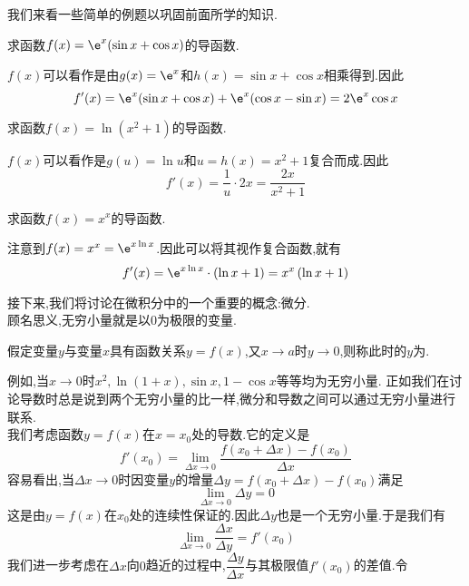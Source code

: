 \documentclass{ctexart}
\begin{document}
我们来看一些简单的例题以巩固前面所学的知识.
\begin{exercise}[E.0A.1]
    求函数$f(x)=\e^x(\sin x+\cos x)$的导函数.
\end{exercise}
\begin{solution}
    $f(x)$可以看作是由$g(x)=\e^x$和$h(x)=\sin x+\cos x$相乘得到.因此
    \[f'(x)=\e^x(\sin x+\cos x)+\e^x(\cos x-\sin x)=2\e^x\cos x\]

\end{solution}
\begin{exercise}[E.0A.2]
    求函数$f(x)=\ln\left(x^2+1\right)$的导函数.
\end{exercise}
\begin{solution}
    $f(x)$可以看作是$g(u)=\ln u$和$u=h(x)=x^2+1$复合而成.因此
    \[f'(x)=\dfrac{1}{u}\cdot 2x=\dfrac{2x}{x^2+1}\]
    
\end{solution}
\begin{exercise}[E.0A.3]
    求函数$f(x)=x^x$的导函数.
\end{exercise}
\begin{solution}
    注意到$f(x)=x^x=\e^{x\ln x}$.因此可以将其视作复合函数,就有
    \[f'(x)=\e^{x\ln x}\cdot(\ln x+1)=x^x\left(\ln x+1\right)\]

\end{solution}
接下来,我们将讨论在微积分中的一个重要的概念:微分.\vspace{12pt}\\
\indent 顾名思义,无穷小量就是以$0$为极限的变量.
\begin{definition}[0A.3.1 无穷小量]
    假定变量$y$与变量$x$具有函数关系$y=f(x)$,又$x\to a$时$y\to0$,则称此时的$y$为.
\end{definition}
例如,当$x\to0$时$x^2,\ln(1+x),\sin x,1-\cos x$等等均为无穷小量.%
正如我们在讨论导数时总是说到两个无穷小量的比一样,微分和导数之间可以通过无穷小量进行联系.\\
\indent 我们考虑函数$y=f(x)$在$x=x_0$处的导数.它的定义是
\[f'\left(x_0\right)=\lim_{\Delta x\to0}\dfrac{f\left(x_0+\Delta x\right)-f\left(x_0\right)}{\Delta x}\]
容易看出,当$\Delta x\to0$时因变量$y$的增量$\Delta y=f\left(x_0+\Delta x\right)-f\left(x_0\right)$满足
\[\lim_{\Delta x\to0}\Delta y=0\]
这是由$y=f(x)$在$x_0$处的连续性保证的.因此$\Delta y$也是一个无穷小量.于是我们有
\[\lim_{\Delta x\to0}\dfrac{\Delta x}{\Delta y}=f'\left(x_0\right)\]
我们进一步考虑在$\Delta x$向$0$趋近的过程中,$\dfrac{\Delta y}{\Delta x}$与其极限值$f'\left(x_0\right)$的差值.令
\end{document}
